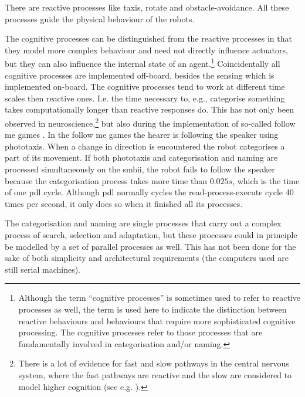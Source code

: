 There are reactive processes like taxis, rotate and obstacle-avoidance. All these processes guide the physical behaviour of the robots.

The cognitive processes can be distinguished from the reactive processes in that they model more complex behaviour and need not directly influence actuators, but they can also influence the internal state of an agent.\footnote{Although the term ``cognitive processes'' is sometimes used to refer to reactive processes as well, the term is used here to indicate the distinction between reactive behaviours and behaviours that require more sophisticated cognitive processing. The cognitive processes refer to those processes that are fundamentally involved in categorisation and/or naming.} Coincidentally all cognitive processes are implemented off-board, besides the sensing which is implemented on-board. The cognitive processes tend to work at different time scales then reactive ones. I.e. the time necessary to, e.g., categorise something takes computationally longer than reactive responses do. This has not only been observed in neuroscience,\footnote{There is a lot of evidence for fast and slow pathways in the central nervous system, where the fast pathways are reactive and the slow are considered to model higher cognition (see e.g. \citealt{ledoux:1996}).} but also during the implementation of so-called follow me games \citep{vogt:1999a,vogt:2000}. In the follow me games the hearer is following the speaker using phototaxis. When a change in direction is encountered the robot categorises a part of its movement. If both phototaxis and categorisation and naming are processed simultaneously on the {\sc smbii}, the robot fails to follow the speaker because the categorisation process takes more time than $0.025 s$, which is the time of one {\sc pdl} cycle. Although {\sc pdl} normally cycles the read-process-execute cycle 40 times per second, it only does so when it finished all its processes. 

The categorisation and naming are single processes that carry out a complex process of search, selection and adaptation, but these processes could in principle be modelled by a set of parallel processes as well. This has not been done for the sake of both simplicity and architectural requirements (the computers used are still serial machines).

